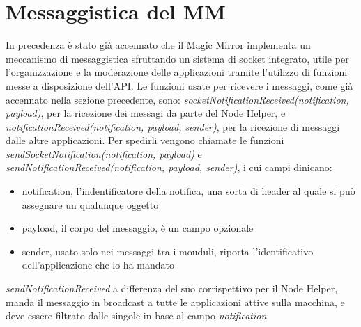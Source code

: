\section{Messaggistica del MM}
In precedenza \`e stato gi\`a accennato che il Magic Mirror implementa un meccanismo di messaggistica sfruttando un sistema di socket integrato,
utile per l'organizzazione e la moderazione delle applicazioni tramite l'utilizzo di funzioni messe a disposizione dell'API.
Le funzioni usate per ricevere i messaggi, come gi\`a accennato nella sezione precedente, sono: \textit{socketNotificationReceived(notification, payload)},
per la ricezione dei messagi da parte del Node Helper, e \textit{notificationReceived(notification, payload, sender)}, per la ricezione di
messaggi dalle altre applicazioni.
Per spedirli vengono chiamate le funzioni \textit{sendSocketNotification(notification, payload)} e \textit{sendNotificationReceived(notification, payload, sender)},
i cui campi dinicano:
\begin{itemize}
\item notification, l'indentificatore della notifica, una sorta di header al quale si pu\`o assegnare un qualunque oggetto
\item payload, il corpo del messaggio, \`e un campo opzionale
\item sender, usato solo nei messaggi tra i mouduli, riporta l'identificativo dell'applicazione che lo ha mandato\\[1\baselineskip]
\end{itemize}
\textit{sendNotificationReceived} a differenza del suo corrispettivo per il Node Helper, manda il messaggio in broadcast a tutte le applicazioni attive
sulla macchina, e deve essere filtrato dalle singole in base al campo \textit{notification}
